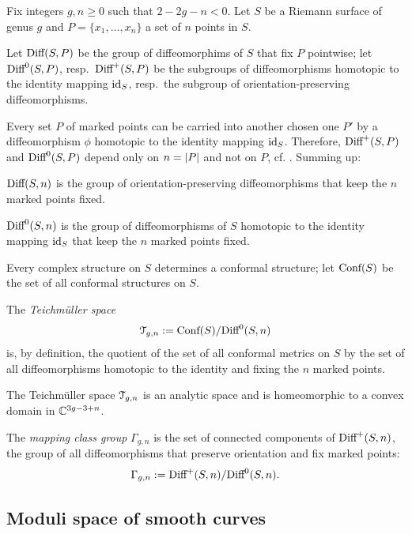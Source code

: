 Fix integers $g,n\geq0$ such that $2 -2g - n < 0$. Let $S$ be a Riemann
surface of genus $g$ and $P = \{ x_1, \ldots, x_n \}$ a set of $n$ points
in $S$.  

Let $\textrm{Diff}(S,P)$ be the group of diffeomorphims of $S$ that fix $P$
pointwise; let $\textrm{Diff}^0(S,P)$, resp.~$\textrm{Diff}^+(S,P)$ be the subgroups
of diffeomorphisms homotopic to the identity mapping $\operatorname{id}_S$,
resp.~the subgroup of orientation-preserving diffeomorphisms.

Every set $P$ of marked points can be carried into another chosen one
$P'$ by a diffeomorphism $\phi$ homotopic to the identity mapping
$\operatorname{id}_S$.  Therefore, $\textrm{Diff}^+(S,P)$ and $\textrm{Diff}^0(S, P)$ depend only on
$n = \lvert P\rvert$ and not on $P$, cf. \cite{krushkal;riemann-surfaces}.
Summing up:
\begin{definition}\label{dfn:diff}
  $\textrm{Diff}(S,n)$ is the group of orientation-preserving diffeomorphisms
  that keep the $n$ marked points fixed.

  $\textrm{Diff}^0(S,n)$ is the group of diffeomorphisms of $S$ homotopic to
  the identity mapping $\operatorname{id}_S$ that keep the $n$ marked points fixed.
\end{definition}

Every complex structure  on $S$ determines a conformal structure; let
$\text{\rm Conf}(S)$ be the set of all conformal structures on $S$. 
\begin{definition}\label{dfn:teichmuller}
  The \emph{Teichm{\"u}ller space}
  \begin{equation*}
    \mathcal{T}_{g,n} := \text{\rm Conf}(S) / \textrm{Diff}^0(S, n)
  \end{equation*}
  is, by definition, the quotient of the set of all conformal metrics on
  $S$ by the set of all diffeomorphisms homotopic to the identity and
  fixing the $n$ marked points.
\end{definition}
The Teichm{\"u}ller space $\mathcal{T}_{g,n}$ is an analytic space and is
homeomorphic to a convex domain in $\mathbb{C}^{3g - 3 + n}$.

\begin{definition}\label{dfn:mapping-class-group}
  The \emph{mapping class group} $\Gamma_{g,n}$ is the set of connected
  components of $\textrm{Diff}^+(S, n)$, the group of all diffeomorphisms that
  preserve orientation and fix marked points:
  \begin{equation*}
    \Gamma_{g,n} := \textrm{Diff}^+ (S, n) / \textrm{Diff}^0(S, n).
  \end{equation*}
\end{definition}


\subsection{Moduli space of smooth curves}
\label{sec:Mgn}

